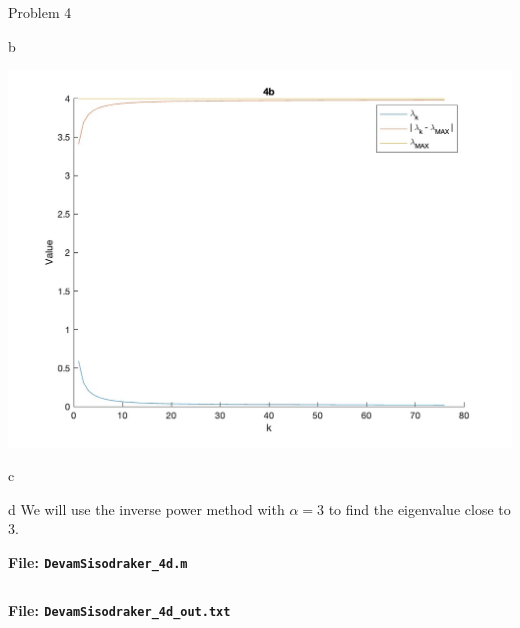 \begin{section}{Problem 4}
\begin{solution}{b}
        \begin{mdframed}
            \includegraphics[scale=0.33]{DevamSisodraker_4b.jpg}
        \end{mdframed}
    \end{solution}
    
    \newpage
    
    \begin{solution}{c}
    \end{solution}
    
    \newpage
    
    \begin{solution}{d}
        We will use the inverse power method with $\alpha = 3$ to find the eigenvalue close to $3$.

        \continued

        \begin{mdframed}
            \footnotesize
            \textbf{File: {\tt DevamSisodraker\_4d.m}}
            \inputminted{matlab}{DevamSisodraker_4d.m}
            \normalfont
        \end{mdframed}
        
        \continued
        
        \begin{mdframed}
            \footnotesize
            \textbf{File: {\tt DevamSisodraker\_4d\_out.txt}}
            \inputminted{matlab}{DevamSisodraker_4d_out.txt}
            \normalfont
        \end{mdframed}

        \continued


\end{solution}
\end{section}
